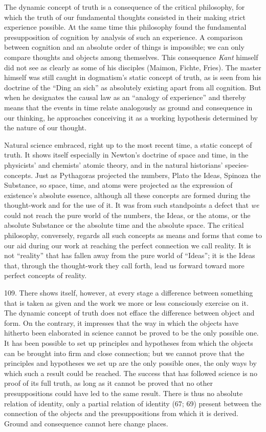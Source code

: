 \documentclass[12pt,a4paper]{book}
\newcommand{\opage}[1]{\marginnote{\footnotesize\textit{[#1]}}}
\begin{document}
The dynamic concept of truth is a consequence of the critical philosophy, for
which the truth of our fundamental thoughts consisted in their making strict
experience possible. At the same time this philosophy found the fundamental
presupposition of cognition by analysis of such an experience. A comparison
between cognition and an absolute order of things is impossible; we can only
compare thoughts and objects among themselves. This consequence \emph{Kant}
himself did not see as clearly as some of his disciples (Maimon, Fichte,
Fries). The master himself was still caught in dogmatism's static concept of
truth, as is seen from his doctrine of the ``Ding an sich'' as absolutely
existing apart from all cognition. But when he designates the causal law as an
``analogy of experience'' and thereby means that the events in time relate
analogously as ground and consequence in our thinking, he approaches
conceiving it as a working hypothesis determined by the nature of our thought.

Natural science embraced, right up to the most recent time, a static concept
of truth. It shows itself especially in Newton's doctrine of space and time,
in the physicists' and chemists' atomic theory, and in the natural historians'
species-concepts. Just as Pythagoras projected the numbers, Plato the Ideas,
Spinoza the Substance, so space, time, and atoms were projected as the
expression of existence's absolute essence, although all these concepts are
formed during the thought-work and for the use of it. It was from such
standpoints a defect that \emph{we} could not reach the pure world of the
numbers, the Ideas, or the atoms, or the absolute Substance or the absolute
time and the absolute space. The critical philosophy, conversely, regards all
such concepts as means and forms that come to our aid during our work at
reaching the perfect connection we call reality. It is not ``reality'' that
has fallen away from the \opage{261}pure world of ``Ideas''; it is the Ideas that,
through the thought-work they call forth, lead us forward toward more perfect
concepts of reality.

109. There shows itself, however, at every stage a difference between
something that is taken as given and the work we more or less consciously
exercise on it. The dynamic concept of truth does not efface the difference
between object and form. On the contrary, it impresses that the way in which
the objects have hitherto been elaborated in science cannot be proved to be
the only possible one. It has been possible to set up principles and
hypotheses from which the objects can be brought into firm and close
connection; but we cannot prove that the principles and hypotheses we set up
are the only possible ones, the only ways by which such a result could be
reached. The success that has followed science is no proof of its full truth,
as long as it cannot be proved that no other presuppositions could have led to
the same result. There is thus no absolute relation of identity, only a partial
relation of identity (67; 69) present between the connection of the objects and
the presuppositions from which it is derived. Ground and consequence cannot
here change places.
\end{document}
